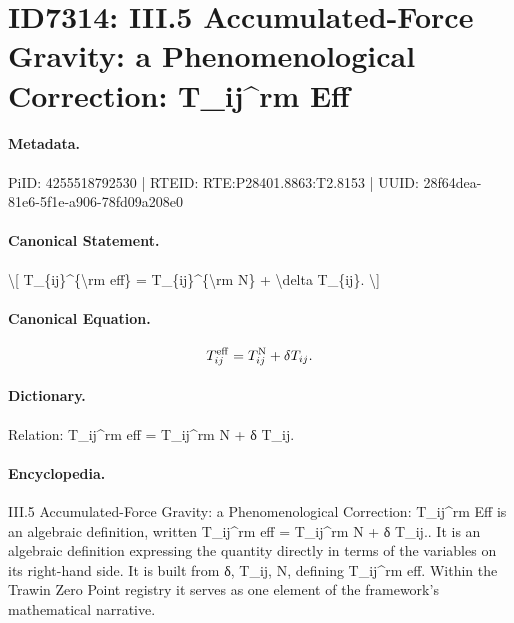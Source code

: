 \section*{ID7314: III.5 Accumulated-Force Gravity: a Phenomenological Correction: T\_ij\textasciicircum{}rm Eff}
\paragraph{Metadata.}
PiID: 4255518792530 | RTEID: RTE:P28401.8863:T2.8153 | UUID: 28f64dea-81e6-5f1e-a906-78fd09a208e0

\paragraph{Canonical Statement.}
\textbackslash{}[ T\_\{ij\}\textasciicircum{}\{\textbackslash{}rm eff\} = T\_\{ij\}\textasciicircum{}\{\textbackslash{}rm N\} + \textbackslash{}delta T\_\{ij\}. \textbackslash{}]

\paragraph{Canonical Equation.}
\[
T_{ij}^{\rm eff} = T_{ij}^{\rm N} + \delta T_{ij}.
\]

\paragraph{Dictionary.}
Relation: T\_ij\textasciicircum{}rm eff = T\_ij\textasciicircum{}rm N + δ T\_ij.

\paragraph{Encyclopedia.}
III.5 Accumulated-Force Gravity: a Phenomenological Correction: T\_ij\textasciicircum{}rm Eff is an algebraic definition, written T\_ij\textasciicircum{}rm eff = T\_ij\textasciicircum{}rm N + δ T\_ij.. It is an algebraic definition expressing the quantity directly in terms of the variables on its right-hand side. It is built from δ, T\_ij, N, defining T\_ij\textasciicircum{}rm eff. Within the Trawin Zero Point registry it serves as one element of the framework's mathematical narrative.
